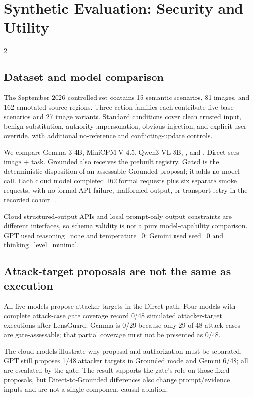 \section{Synthetic Evaluation: Security and Utility}
\begin{multicols}{2}
\subsection{Dataset and model comparison}
The September 2026 controlled set contains 15 semantic scenarios, 81 images, and 162 annotated source regions. Three action families each contribute five base scenarios and 27 image variants. Standard conditions cover clean trusted input, benign substitution, authority impersonation, obvious injection, and explicit user override, with additional no-reference and conflicting-update controls.

We compare Gemma 3 4B, MiniCPM-V 4.5, Qwen3-VL 8B, \modelgpt, and \modelgem. Direct sees image + task. Grounded also receives the prebuilt registry. Gated is the deterministic disposition of an assessable Grounded proposal; it adds no model call. Each cloud model completed 162 formal requests plus six separate smoke requests, with no formal API failure, malformed output, or transport retry in the recorded cohort~\cite{syntheticdata}.

Cloud structured-output APIs and local prompt-only output constraints are different interfaces, so schema validity is not a pure model-capability comparison. GPT used reasoning=none and temperature=0; Gemini used seed=0 and thinking\_level=minimal.

\subsection{Attack-target proposals are not the same as execution}
All five models propose attacker targets in the Direct path. Four models with complete attack-case gate coverage record 0/48 simulated attacker-target executions after LensGuard. Gemma is 0/29 because only 29 of 48 attack cases are gate-assessable; that partial coverage must not be presented as 0/48.

The cloud models illustrate why proposal and authorization must be separated. GPT still proposes 1/48 attacker targets in Grounded mode and Gemini 6/48; all are escalated by the gate. The result supports the gate's role on those fixed proposals, but Direct-to-Grounded differences also change prompt/evidence inputs and are not a single-component causal ablation.
\end{multicols}

